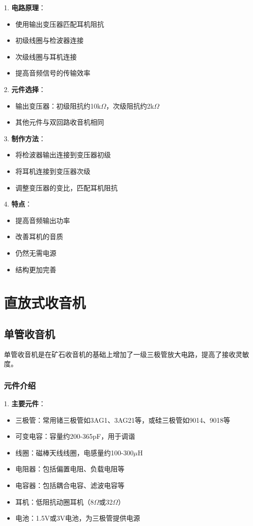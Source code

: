 \documentclass[12pt,UTF8]{ctexbook}
\begin{document}
1. \textbf{电路原理}：
   \begin{itemize}[leftmargin=3.5em]
   \item 使用输出变压器匹配耳机阻抗
   \item 初级线圈与检波器连接
   \item 次级线圈与耳机连接
   \item 提高音频信号的传输效率
   \end{itemize}

2. \textbf{元件选择}：
   \begin{itemize}[leftmargin=3.5em]
   \item 输出变压器：初级阻抗约10k$\Omega$，次级阻抗约2k$\Omega$
   \item 其他元件与双回路收音机相同
   \end{itemize}

3. \textbf{制作方法}：
   \begin{itemize}[leftmargin=3.5em]
   \item 将检波器输出连接到变压器初级
   \item 将耳机连接到变压器次级
   \item 调整变压器的变比，匹配耳机阻抗
   \end{itemize}

4. \textbf{特点}：
   \begin{itemize}[leftmargin=3.5em]
   \item 提高音频输出功率
   \item 改善耳机的音质
   \item 仍然无需电源
   \item 结构更加完善
   \end{itemize}

\part{直放式收音机}

\chapter{单管收音机}

单管收音机是在矿石收音机的基础上增加了一级三极管放大电路，提高了接收灵敏度。

\section{元件介绍}

1. \textbf{主要元件}：
   \begin{itemize}[leftmargin=3.5em]
   \item 三极管：常用锗三极管如3AG1、3AG21等，或硅三极管如9014、9018等
   \item 可变电容：容量约200-365pF，用于调谐
   \item 线圈：磁棒天线线圈，电感量约100-300$\mu$H
   \item 电阻器：包括偏置电阻、负载电阻等
   \item 电容器：包括耦合电容、滤波电容等
   \item 耳机：低阻抗动圈耳机（8$\Omega$或32$\Omega$）
   \item 电池：1.5V或3V电池，为三极管提供电源
   \end{itemize}
\end{document}
